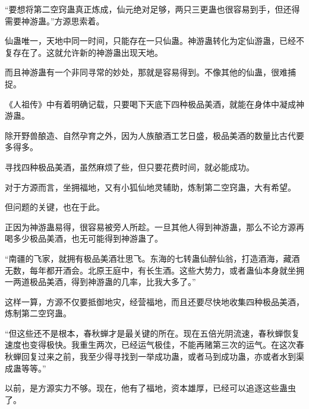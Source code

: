 \begin{this_body}
“要想将第二空窍蛊真正炼成，仙元绝对足够，两只三更蛊也很容易到手，但还得需要神游蛊。”方源思索着。

仙蛊唯一，天地中同一时间，只能存在一只仙蛊。神游蛊转化为定仙游蛊，已经不复存在了。这就允许新的神游蛊出现天地。

而且神游蛊有一个非同寻常的妙处，那就是容易得到。不像其他的仙蛊，很难捕捉。

《人祖传》中有着明确记载，只要喝下天底下四种极品美酒，就能在身体中凝成神游蛊。

除开野兽酿造、自然孕育之外，因为人族酿酒工艺日盛，极品美酒的数量比古代要多得多。

寻找四种极品美酒，虽然麻烦了些，但只要花费时间，就必能成功。

对于方源而言，坐拥福地，又有小狐仙地灵辅助，炼制第二空窍蛊，大有希望。

但问题的关键，也在于此。

正因为神游蛊易得，很容易被旁人所趁。一旦其他人得到神游蛊，那么不论方源再喝多少极品美酒，也无可能得到神游蛊了。

“南疆的飞家，就拥有极品美酒壮思飞。东海的七转蛊仙醉仙翁，打造酒海，藏酒无数，每年都开酒会。北原王庭中，有长生酒。这些大势力，或者蛊仙本身就坐拥一两道极品美酒，得到神游蛊的几率，比我大多了。”

这样一算，方源不仅要抵御地灾，经营福地，而且还要尽快地收集四种极品美酒，炼制第二空窍蛊。

“但这些还不是根本，春秋蝉才是最关键的所在。现在五倍光阴流速，春秋蝉恢复速度也变得极快。我重生两次，已经运气极佳，不能再赌第三次的运气。在这次春秋蝉回复过来之前，我至少得寻找到一举成功蛊，或者马到成功蛊，亦或者水到渠成蛊等等。”

以前，是方源实力不够。现在，他有了福地，资本雄厚，已经可以追逐这些蛊虫了。

\end{this_body}

